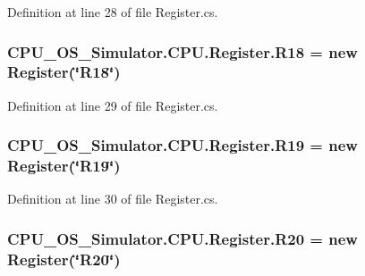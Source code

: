 Definition at line 28 of file Register.\+cs.

\hypertarget{class_c_p_u___o_s___simulator_1_1_c_p_u_1_1_register_aac05b1dce0cbfda874ca7c1783485095}{}
\subsubsection[{R18}]{ C\+P\+U\+\_\+\+O\+S\+\_\+\+Simulator.\+C\+P\+U.\+Register.\+R18 = new {\bf Register}(\char`\"{}R18\char`\"{})\hspace{0.3cm}{\ttfamily [static]}}\label{class_c_p_u___o_s___simulator_1_1_c_p_u_1_1_register_aac05b1dce0cbfda874ca7c1783485095}


Definition at line 29 of file Register.\+cs.

\hypertarget{class_c_p_u___o_s___simulator_1_1_c_p_u_1_1_register_a1d5394eb0e63d28e96decccbdbc2ec2c}{}
\subsubsection[{R19}]{ C\+P\+U\+\_\+\+O\+S\+\_\+\+Simulator.\+C\+P\+U.\+Register.\+R19 = new {\bf Register}(\char`\"{}R19\char`\"{})\hspace{0.3cm}{\ttfamily [static]}}\label{class_c_p_u___o_s___simulator_1_1_c_p_u_1_1_register_a1d5394eb0e63d28e96decccbdbc2ec2c}


Definition at line 30 of file Register.\+cs.

\hypertarget{class_c_p_u___o_s___simulator_1_1_c_p_u_1_1_register_a6fe52ef881281bbfdc42aa7f4cc68f4d}{}
\subsubsection[{R20}]{ C\+P\+U\+\_\+\+O\+S\+\_\+\+Simulator.\+C\+P\+U.\+Register.\+R20 = new {\bf Register}(\char`\"{}R20\char`\"{})\hspace{0.3cm}{\ttfamily [static]}}\label{class_c_p_u___o_s___simulator_1_1_c_p_u_1_1_register_a6fe52ef881281bbfdc42aa7f4cc68f4d}


